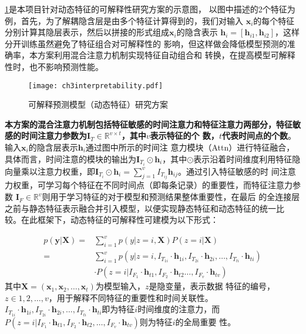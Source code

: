 \cref{fig:ch3:interpretability}是本项目针对动态特征的可解释性研究方案的示意图，
以图中描述的2个特征为例，首先，为了解耦隐含层是由多个特征计算得到的，我们对输入
$\bm x_i$的每个特征分别计算其隐层表示，然后以拼接的形式组成$\bm x_i$的隐含表示
$\bm h_i = [\bm h_{i1}, \bm h_{i2}]$，这样分开训练虽然避免了特征组合对可解释性的
影响，但这样做会降低模型预测的准确率，本方案利用混合注意力机制实现特征自动组合和
转换，在提高模型可解释性时，也不影响预测性能。

\begin{figure}
    \begin{small}
        \begin{center}
            \texttt{[image: ch3interpretability.pdf]}
        \end{center}
        \caption{可解释预测模型（动态特征）研究方案}
        \label{fig:ch3:interpretability}
    \end{small}
\end{figure}

\textbf{本方案的混合注意力机制包括特征敏感的时间注意力和特征注意力两部分，特征敏
感的时间注意力参数为$\bm I_T \in \mathbb R^{v \times t}$，其中$v$表示特征的个
数，$t$代表时间点的个数}。输入$\bm x_i$的隐含层表示$\bm h_i$通过图中所示的时间注
意力模块（Attn）进行特征融合，具体而言，时间注意的模块的输出为$\bm I_{T_i} \odot
\bm h_i$，其中$\odot$表示沿着时间维度利用特征隐向量乘以注意力权重，即$\bm
I_{T_i} \odot \bm h_i= \sum_{j=1}^v I_{T_{ij}} \bm h_{ij}$。通过引入特征敏感的时
间注意力权重，可学习每个特征在不同时间点（即每条记录）的重要性，而特征注意力参数
$\bm I_F \in \mathbb R^{v}$则用于学习特征的对于模型和预测结果整体重要性，在最后
的全连接层之前与静态特征表示融合并引入模型，以便实现静态特征和动态特征的统一比
较。在此框架下，动态特征的可解释性可建模为以下形式：

\begin{equation}
    \begin{aligned}
        p(\bm y | \bm X) =& \sum_{i=1}^v p(y|z=i, \bm X) P(z=i | \bm X) \\
            =& \sum_{i=1}^v p(y|z=i, I_{T_{1i}} \cdot \bm h_{1i}, I_{T_{2i}} \cdot \bm h_{2i}, \dots, I_{T_{ti}} \cdot \bm h_{ti}) \\
            & \cdot P(z=i|I_{F_1} \cdot \bm h_{t1}, I_{F_2} \cdot \bm h_{t2} \dots, I_{F_v} \cdot \bm h_{tv})
    \end{aligned}
\end{equation}
其中$\bm X= (\bm x_1, \bm x_2, \dots, \bm x_t)$为模型输入，$z$是隐变量，表示数据
特征的编号，$z \in {1,2,\dots, v}$，用于解释不同特征的重要性和时间关联性。
$I_{T_{1i}} \cdot \bm h_{1i}, I_{T_{2i}} \cdot \bm h_{2i}, \dots, I_{T_{ti}}
\cdot \bm h_{ti}$即为特征$i$时间维度的注意力，而$P(z=i|I_{F_1} \cdot \bm h_{t1},
I_{F_2} \cdot \bm h_{t2}, \dots, I_{F_v} \cdot \bm h_{tv})$则为特征$i$的全局重要
性。


